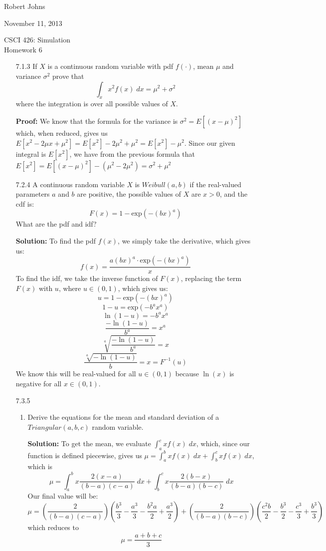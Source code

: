 \documentclass[11pt]{article} %
\newcommand{\inv}{^{-1}}
\newcommand{\tr}{\textrm}
\begin{document}
\hfill Robert Johns

\hfill November 11, 2013

\begin{center} {\Large CSCI 426: Simulation}\\{\large Homework 6}\end{center}

\begin{enumerate}

\item[7.1.3] If $X$ is a continuous random variable with pdf $f(\cdot)$, mean $\mu$ and variance $\sigma^2$ prove that
$$\int_x x^2f(x)\;dx = \mu^2 + \sigma^2$$
where the integration is over all possible values of $X$.

{\bf Proof:} We know that the formula for the variance is $\sigma^2 = E[(x-\mu)^2]$ which, when reduced, gives us $E[x^2 -2\mu x + \mu^2] = E[x^2] - 2\mu^2 + \mu^2 = E[x^2] - \mu^2$.  Since our given integral is $E[x^2]$, we have from the previous formula that $E[x^2] = E[(x-\mu)^2] - (\mu^2 - 2\mu^2) = \sigma^2 + \mu^2$

\item[7.2.4] A continuous random variable $X$ is $Weibull(a,b)$ if the real-valued parameters $a$ and $b$ are positive, the possible values of $X$ are $x > 0$, and the cdf is:
$$F(x) = 1- \tr{exp}(-(bx)^a)$$
What are the pdf and idf?

{\bf Solution:} To find the pdf $f(x)$, we simply take the derivative, which gives us:
$$f(x) = \frac{a(bx)^a\cdot \tr{exp}(-(bx)^a)}{x}$$
To find the idf, we take the inverse function of $F(x)$, replacing the term $F(x)$ with $u$, where $u\in(0,1)$, which gives us:
$$u = 1 - \tr{exp}(-(bx)^a)$$
$$ 1 - u = \tr{exp}(-b^ax^a)$$
$$ \ln(1-u) = -b^ax^a$$
$$ \frac{-\ln(1-u)}{b^a} = x^a$$
$$ \sqrt[a]{\frac{-\ln(1-u)}{b^a}} = x$$
$$ \frac{\sqrt[a]{-\ln(1-u)}}{b} = x = F\inv(u)$$
We know this will be real-valued for all $u\in(0,1)$ because $\ln(x)$ is negative for all $x\in(0,1)$.

\newpage

\item[7.3.5] 

\begin{enumerate}
\item Derive the equations for the mean and standard deviation of a $Triangular(a,b,c)$ random variable.

{\bf Solution:} To get the mean, we evaluate $\int_a^cxf(x)\;dx$, which, since our function is defined piecewise, gives us $\mu = \int_a^bxf(x)\;dx + \int_b^cxf(x)\;dx$, which is
$$\mu = \int_a^bx\frac{2(x-a)}{(b-a)(c-a)}\;dx + \int_b^cx\frac{2(b-x)}{(b-a)(b-c)}\;dx$$
Our final value will be:
$$\mu = \left(\frac{2}{(b-a)(c-a)}\right)\left(\frac{b^3}{3} - \frac{a^3}{3} - \frac{b^2a}{2} + \frac{a^3}{2}\right)
+ \left(\frac{2}{(b-a)(b-c)}\right)\left(\frac{c^2b}{2}-\frac{b^3}{2} -\frac{c^3}{3}+\frac{b^3}{3}\right)$$
which reduces to
$$\mu = \frac{a+b+c}{3}$$


\end{enumerate}
\end{enumerate}
\end{document}
